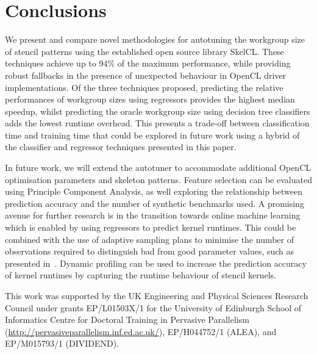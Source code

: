 \documentclass[preprint,nonatbib,10pt,nocopyrightspace]{sigplanconf}
\begin{document}
\section{Conclusions}\label{sec:conclusions}

We present and compare novel methodologies for autotuning the workgroup size of
stencil patterns using the established open source library SkelCL. These
techniques achieve up to 94\% of the maximum performance, while providing robust
fallbacks in the presence of unexpected behaviour in OpenCL driver
implementations. Of the three techniques proposed, predicting the relative
performances of workgroup sizes using regressors provides the highest median
speedup, whilst predicting the oracle workgroup size using decision tree
classifiers adds the lowest runtime overhead. This presents a trade-off between
classification time and training time that could be explored in future work
using a hybrid of the classifier and regressor techniques presented in this
paper.

In future work, we will extend the autotuner to accommodate additional OpenCL
optimisation parameters and skeleton patterns. Feature selection can be
evaluated using Principle Component Analysis, as well exploring the relationship
between prediction accuracy and the number of synthetic benchmarks used. A
promising avenue for further research is in the transition towards online
machine learning which is enabled by using regressors to predict kernel
runtimes. This could be combined with the use of adaptive sampling plans to
minimise the number of observations required to distinguish bad from good
parameter values, such as presented in~\cite{Leather2009}. Dynamic profiling can
be used to increase the prediction accuracy of kernel runtimes by capturing the
runtime behaviour of stencil kernels.


\acks

This work was supported by the UK Engineering and Physical Sciences Research
Council under grants EP/L01503X/1 for the University of Edinburgh School of
Informatics Centre for Doctoral Training in Pervasive Parallelism
(\url{http://pervasiveparallelism.inf.ed.ac.uk/}), EP/H044752/1 (ALEA), and
EP/M015793/1 (DIVIDEND).

\label{bibliography}
\printbibliography
\end{document}
